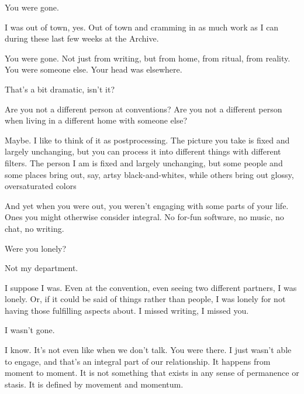 \begin{paracol}{2}
  \begin{leftcolumn}

\begin{ally}
You were gone.
\end{ally}
I was out of town, yes. Out of town and cramming in as much work as I can during these last few weeks at the Archive.

\begin{ally}
You were gone. Not just from writing, but from home, from ritual, from reality. You were someone else. Your head was elsewhere.
\end{ally}
That's a bit dramatic, isn't it?

\begin{ally}
Are you not a different person at conventions? Are you not a different person when living in a different home with someone else?
\end{ally}
Maybe. I like to think of it as postprocessing. The picture you take is fixed and largely unchanging, but you can process it into different things with different filters. The person I am is fixed and largely unchanging, but some people and some places bring out, say, artsy black-and-whites, while others bring out glossy, oversaturated colors

\begin{ally}
And yet when you were out, you weren't engaging with some parts of your life. Ones you might otherwise consider integral. No for-fun software, no music, no chat, no writing.
\end{ally}
Were you lonely?

\begin{ally}
Not my department.
\end{ally}
I suppose I was. Even at the convention, even seeing two different partners, I was lonely. Or, if it could be said of things rather than people, I was lonely for not having those fulfilling aspects about. I missed writing, I missed you.

\begin{ally}
I wasn't gone.
\end{ally}
I know. It's not even like when we don't talk. You were there. I just wasn't able to engage, and that's an integral part of our relationship. It happens from moment to moment. It is not something that exists in any sense of permanence or stasis. It is defined by movement and momentum.
\newpage
\end{leftcolumn}
\end{paracol}
